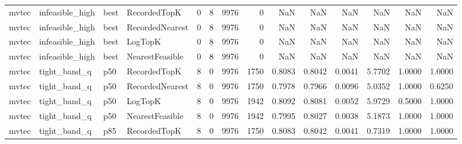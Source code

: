 \begin{tabular}{llllrrrrrrrrrr}
   mvtec &      infeasible\_high &   best &    RecordedTopK &           0 &          8 &           9976 &                   0 &            NaN &             NaN &                       NaN &            NaN &                    NaN &                     NaN \\
   mvtec &      infeasible\_high &   best & RecordedNearest &           0 &          8 &           9976 &                   0 &            NaN &             NaN &                       NaN &            NaN &                    NaN &                     NaN \\
   mvtec &      infeasible\_high &   best &         LogTopK &           0 &          8 &           9976 &                   0 &            NaN &             NaN &                       NaN &            NaN &                    NaN &                     NaN \\
   mvtec &      infeasible\_high &   best & NearestFeasible &           0 &          8 &           9976 &                   0 &            NaN &             NaN &                       NaN &            NaN &                    NaN &                     NaN \\
   mvtec &         tight\_band\_q &    p50 &    RecordedTopK &           8 &          0 &           9976 &                1750 &         0.8083 &          0.8042 &                    0.0041 &         5.7702 &                 1.0000 &                  1.0000 \\
   mvtec &         tight\_band\_q &    p50 & RecordedNearest &           8 &          0 &           9976 &                1750 &         0.7978 &          0.7966 &                    0.0096 &         5.0352 &                 1.0000 &                  0.6250 \\
   mvtec &         tight\_band\_q &    p50 &         LogTopK &           8 &          0 &           9976 &                1942 &         0.8092 &          0.8081 &                    0.0052 &         5.9729 &                 0.5000 &                  1.0000 \\
   mvtec &         tight\_band\_q &    p50 & NearestFeasible &           8 &          0 &           9976 &                1942 &         0.7995 &          0.8027 &                    0.0038 &         5.1873 &                 1.0000 &                  1.0000 \\
   mvtec &         tight\_band\_q &    p85 &    RecordedTopK &           8 &          0 &           9976 &                1750 &         0.8083 &          0.8042 &                    0.0041 &         0.7319 &                 1.0000 &                  1.0000 \\

\end{tabular}

